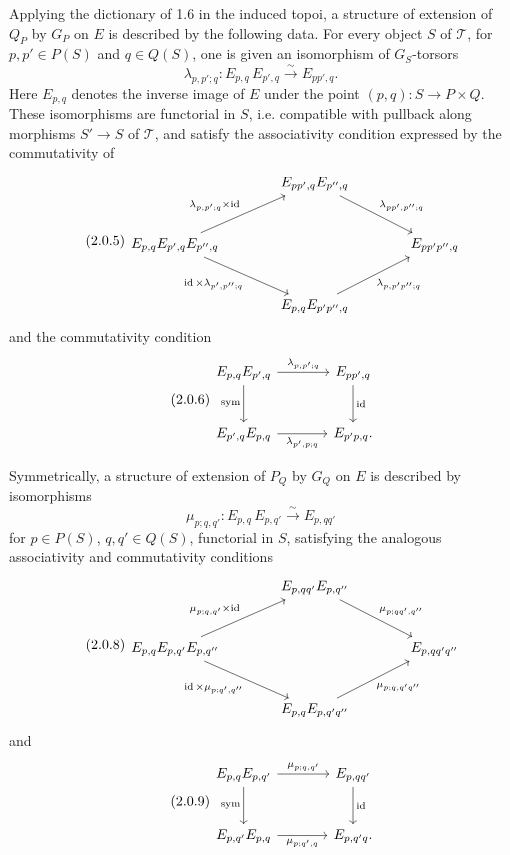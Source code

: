 \documentclass[11pt]{article}
\providecommand{\id}{\operatorname{id}}
\providecommand{\sym}{\mathrm{sym}}
\providecommand{\id}{\mathrm{id}}
\begin{document}
Applying the dictionary of 1.6 in the induced topoi, a structure of extension of \(Q_P\) by \(G_P\) on \(E\) is described by the following data.  For every object \(S\) of \(\mathcal T\), for \(p,p'\in P(S)\) and \(q\in Q(S)\), one is given an isomorphism of \(G_S\)-torsors
\begin{equation}\tag{2.0.4}
  \lambda_{p,p';q}: E_{p,q}\,E_{p',q}\xrightarrow{\sim}E_{pp',q}.
\end{equation}
Here \(E_{p,q}\) denotes the inverse image of \(E\) under the point \((p,q):S\to P\times Q\).  These isomorphisms are functorial in \(S\), i.e. compatible with pullback along morphisms \(S'\to S\) of \(\mathcal T\), and satisfy the associativity condition expressed by the commutativity of
\begin{equation}\tag{2.0.5}
\begin{tikzcd}[column sep=large,row sep=large]
& E_{pp',q}E_{p'',q}\arrow[dr,"\lambda_{pp',p'';q}"]&\\
E_{p,q}E_{p',q}E_{p'',q}
\arrow[ur,"\lambda_{p,p';q}\times\id"]
\arrow[dr,"\id\times\lambda_{p',p'';q}"']&&E_{pp'p'',q}\\
& E_{p,q}E_{p'p'',q}\arrow[ur,"\lambda_{p,p'p'';q}"']&
\end{tikzcd}
\end{equation}
and the commutativity condition
\begin{equation}\tag{2.0.6}
\begin{tikzcd}[column sep=large,row sep=large]
E_{p,q}E_{p',q}\arrow[r,"\lambda_{p,p';q}"]\arrow[d,"\sym"']&E_{pp',q}\arrow[d,"\id"]\\
E_{p',q}E_{p,q}\arrow[r,"\lambda_{p',p;q}"']&E_{p'p,q}.
\end{tikzcd}
\end{equation}

Symmetrically, a structure of extension of \(P_Q\) by \(G_Q\) on \(E\) is described by isomorphisms
\begin{equation}\tag{2.0.7}
  \mu_{p;q,q'}:E_{p,q}\,E_{p,q'}\xrightarrow{\sim}E_{p,qq'}
\end{equation}
for \(p\in P(S)\), \(q,q'\in Q(S)\), functorial in \(S\), satisfying the analogous associativity and commutativity conditions
\begin{equation}\tag{2.0.8}
\begin{tikzcd}[column sep=large,row sep=large]
& E_{p,qq'}E_{p,q''}\arrow[dr,"\mu_{p;qq',q''}"]&\\
E_{p,q}E_{p,q'}E_{p,q''}
\arrow[ur,"\mu_{p;q,q'}\times\id"]
\arrow[dr,"\id\times\mu_{p;q',q''}"']&&E_{p,qq'q''}\\
& E_{p,q}E_{p,q'q''}\arrow[ur,"\mu_{p;q,q'q''}"']&
\end{tikzcd}
\end{equation}
and
\begin{equation}\tag{2.0.9}
\begin{tikzcd}[column sep=large,row sep=large]
E_{p,q}E_{p,q'}\arrow[r,"\mu_{p;q,q'}"]\arrow[d,"\sym"']&E_{p,qq'}\arrow[d,"\id"]\\
E_{p,q'}E_{p,q}\arrow[r,"\mu_{p;q',q}"']&E_{p,q'q}.
\end{tikzcd}
\end{equation}
\end{document}
